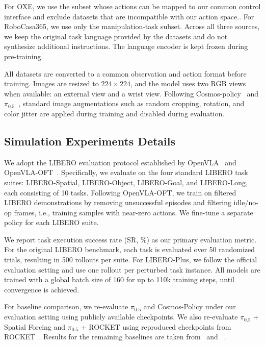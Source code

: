 For OXE, we use the subset whose actions can be mapped to our common control interface and exclude datasets that are incompatible with our action space.. For RoboCasa365, we use only the manipulation-task subset. Across all three sources, we keep the original task language provided by the datasets and do not synthesize additional instructions. The language encoder is kept frozen during pre-training.

All datasets are converted to a common observation and action format before training. Images are resized to \(224\times224\), and the model uses two RGB views when available: an external view and a wrist view. Following Cosmos-policy~\cite{kim2026cosmos} and $\pi_{0.5}$~\cite{pi05}, standard image augmentations such as random cropping, rotation, and color jitter are applied during training and disabled during evaluation.





\subsection{Simulation Experiments Details}
\label{sec:appendix-simulation_details}
We adopt the LIBERO evaluation protocol established by OpenVLA~\cite{kim2024openvla} and OpenVLA-OFT~\cite{openvla_oft}. Specifically, we evaluate on the four standard LIBERO task suites: LIBERO-Spatial, LIBERO-Object, LIBERO-Goal, and LIBERO-Long, each consisting of 10 tasks. Following OpenVLA-OFT, we train on filtered LIBERO demonstrations by removing unsuccessful episodes and filtering idle/no-op frames, i.e., training samples with near-zero actions. We fine-tune a separate policy for each LIBERO suite. 

We report task execution success rate (SR, \%) as our primary evaluation metric. For the original LIBERO benchmark, each task is evaluated over 50 randomized trials, resulting in 500 rollouts per suite. For LIBERO-Plus, we follow the official evaluation setting and use one rollout per perturbed task instance. All models are trained with a global batch size of 160 for up to 110k training steps, until convergence is achieved. 

For baseline comparison, we re-evaluate $\pi_{0.5}$ and Cosmos-Policy under our evaluation setting using publicly available checkpoints. We also re-evaluate $\pi_{0.5}$ + Spatial Forcing and $\pi_{0.5}$ + ROCKET using reproduced checkpoints from ROCKET~\cite{sun2026rocket}. Results for the remaining baselines are taken from~\citet{fei2025libero} and ~\citet{zheng2026pokevla}.

